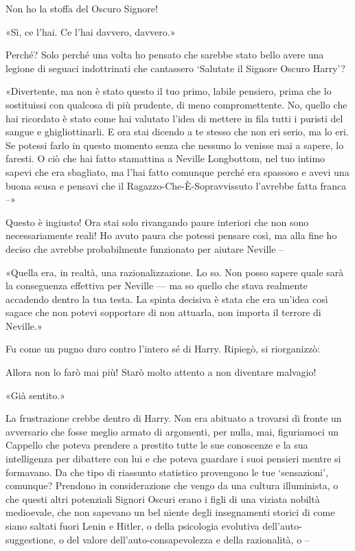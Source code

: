 Non ho la stoffa del Oscuro Signore!

«Sì, ce l’hai. Ce l’hai davvero, davvero.»

Perché? Solo perché una volta ho pensato che sarebbe stato bello avere una legione di seguaci indottrinati che cantassero ‘Salutate il Signore Oscuro Harry’?

«Divertente, ma non è stato questo il tuo primo, labile pensiero, prima che lo sostituissi con qualcosa di più prudente, di meno compromettente. No, quello che hai ricordato è stato come hai valutato l’idea di mettere in fila tutti i puristi del sangue e ghigliottinarli. E ora stai dicendo a te stesso che non eri serio, ma lo eri. Se potessi farlo in questo momento senza che nessuno lo venisse mai a sapere, lo faresti. O ciò che hai fatto stamattina a Neville Longbottom, nel tuo intimo sapevi che era sbagliato, ma l’hai fatto comunque perché era spassoso e avevi una buona scusa e pensavi che il Ragazzo-Che-È-Sopravvissuto l’avrebbe fatta franca –»

Questo è ingiusto! Ora stai solo rivangando paure interiori che non sono necessariamente reali! Ho avuto paura che potessi pensare così, ma alla fine ho deciso che avrebbe probabilmente funzionato per aiutare Neville –

«Quella era, in realtà, una razionalizzazione. Lo so. Non posso sapere quale sarà la conseguenza effettiva per Neville — ma so quello che stava realmente accadendo dentro la tua testa. La spinta decisiva è stata che era un’idea così sagace che non potevi sopportare di non attuarla, non importa il terrore di Neville.»

Fu come un pugno duro contro l’intero sé di Harry. Ripiegò, si riorganizzò:

Allora non lo farò mai più! Starò molto attento a non diventare malvagio!

«Già sentito.»

La frustrazione crebbe dentro di Harry. Non era abituato a trovarsi di fronte un avversario che fosse meglio armato di argomenti, per nulla, mai, figuriamoci un Cappello che poteva prendere a prestito tutte le sue conoscenze e la sua intelligenza per dibattere con lui e che poteva guardare i suoi pensieri mentre si formavano. Da che tipo di riassunto statistico provengono le tue ‘sensazioni’, comunque? Prendono in considerazione che vengo da una cultura illuminista, o che questi altri potenziali Signori Oscuri erano i figli di una viziata nobiltà medioevale, che non sapevano un bel niente degli insegnamenti storici di come siano saltati fuori Lenin e Hitler, o della psicologia evolutiva dell’auto-suggestione, o del valore dell’auto-consapevolezza e della razionalità, o –

